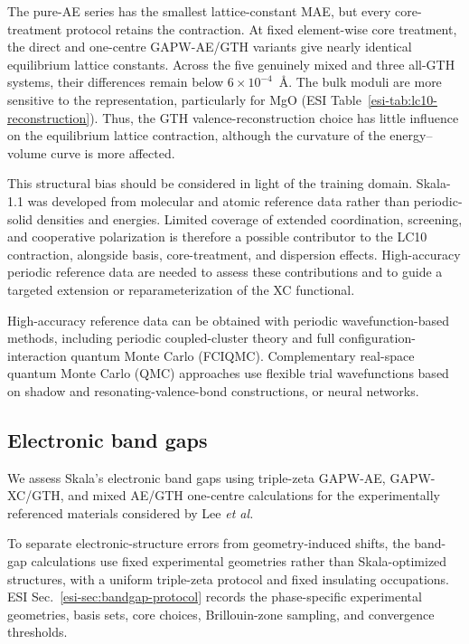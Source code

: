 \documentclass[10pt,a4paper,twocolumn]{article}
\begin{document}
The pure-AE series has the smallest lattice-constant MAE, but every core-treatment protocol retains the contraction. At fixed element-wise core treatment, the direct and one-centre GAPW-AE/GTH variants give nearly identical equilibrium lattice constants. Across the five genuinely mixed and three all-GTH systems, their differences remain below $6\times10^{-4}$~\AA{}. The bulk moduli are more sensitive to the representation, particularly for MgO (ESI Table~\ref{esi-tab:lc10-reconstruction}). Thus, the GTH valence-reconstruction choice has little influence on the equilibrium lattice contraction, although the curvature of the energy--volume curve is more affected.

This structural bias should be considered in light of the training domain. Skala-1.1 was developed from molecular and atomic reference data rather than periodic-solid densities and energies.\cite{Skala2025,Ehlert2026ACC} Limited coverage of extended coordination, screening, and cooperative polarization is therefore a possible contributor to the LC10 contraction, alongside basis, core-treatment, and dispersion effects. High-accuracy periodic reference data are needed to assess these contributions and to guide a targeted extension or reparameterization of the XC functional.

High-accuracy reference data can be obtained with periodic wavefunction-based methods,\cite{Azadi2020Hydrogen} including periodic coupled-cluster theory\cite{Hummel2017,Gruber2018} and full configuration-interaction quantum Monte Carlo (FCIQMC).\cite{Booth2013} Complementary real-space quantum Monte Carlo (QMC) approaches use flexible trial wavefunctions based on shadow\cite{Calcavecchia2014Shadow,Calcavecchia2015Shadow,Calcavecchia2018} and resonating-valence-bond constructions,\cite{Azadi2015Ozone} or neural networks.\cite{Kessler2021,Hermann2020PauliNet,Pfau2020FermiNet}


\subsection{Electronic band gaps}
\label{sec:bandgap-results}

We assess Skala's electronic band gaps using triple-zeta GAPW-AE, GAPW-XC/GTH, and mixed AE/GTH one-centre calculations for the experimentally referenced materials considered by Lee \emph{et al.}\cite{Lee2021Gaps,Lee2022Hybrids}

To separate electronic-structure errors from geometry-induced shifts, the band-gap calculations use fixed experimental geometries rather than Skala-optimized structures, with a uniform triple-zeta protocol and fixed insulating occupations.  ESI Sec.~\ref{esi-sec:bandgap-protocol} records the phase-specific experimental geometries, basis sets, core choices, Brillouin-zone sampling, and convergence thresholds.
\end{document}
